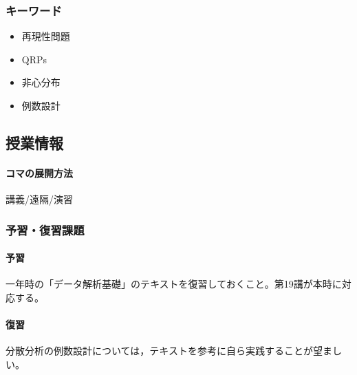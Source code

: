 \subsubsection{キーワード}
\begin{itemize}
	\item 再現性問題
	\item QRPs
	\item 非心分布
	\item 例数設計
\end{itemize}
\subsection{授業情報}
\paragraph{コマの展開方法}
講義/遠隔/演習
\subsubsection{予習・復習課題}
\paragraph{予習}  一年時の「データ解析基礎」のテキストを復習しておくこと。第19講が本時に対応する。
\paragraph{復習} 分散分析の例数設計については，テキストを参考に自ら実践することが望ましい。
